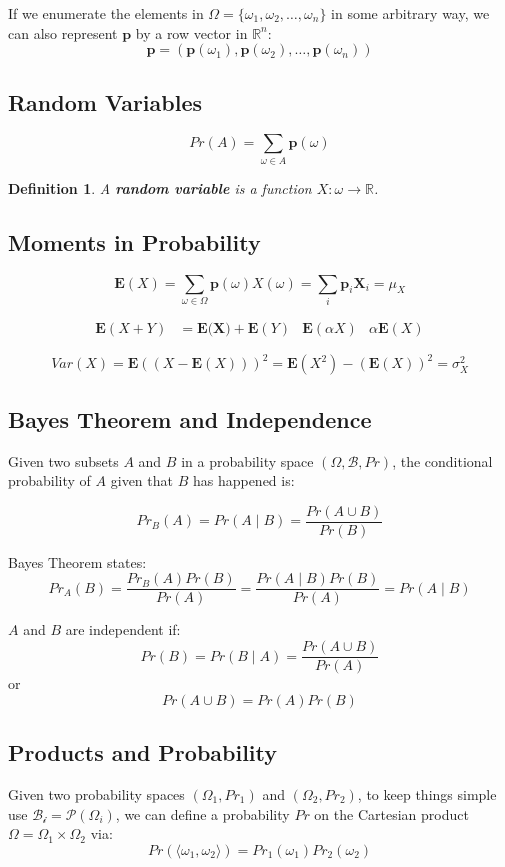 \documentclass[11pt]{article}
\newtheorem{defn}{Definition}
\begin{document}
If we enumerate the elements in $\Omega = \{\omega_1, \omega_2, \ldots, \omega_n \}$ in some arbitrary way, we can also represent $\textbf{p}$ by a row vector in $\mathbb{R}^n$:
\[
  \textbf{p} = (\textbf{p}(\omega_1), \textbf{p}(\omega_2), \ldots, \textbf{p}(\omega_n))
\]

\subsection{Random Variables} 
\[
  Pr(A) = \sum_{\omega \in A} \textbf{p}(\omega)
\]

\begin{defn}
  A \textbf{random variable} is a function $X : \omega \rightarrow \mathbb{R}$.
\end{defn}

\subsection{Moments in Probability}
\[
  \textbf{E}(X) = \sum_{\omega \in \Omega} \textbf{p}(\omega)X(\omega) = \sum_i \textbf{p}_i \textbf{X}_i = \mu_X
\]

\begin{align*}
  \textbf{E}(X + Y) &= \textbf{E(X)} + \textbf{E}(Y) & \textbf{E}(\alpha X) & \alpha \textbf{E}(X)
\end{align*}

\[
  Var(X) = \textbf{E}((X - \textbf{E}(X)))^2 = \textbf{E}(X^2) - (\textbf{E}(X))^2 = \sigma_X^2
\]

\subsection{Bayes Theorem and Independence}
Given two subsets $A$ and $B$ in a probability space $(\Omega, \mathcal{B}, Pr)$, the conditional probability of $A$ given that $B$ has happened is:

\[
  Pr_B(A) = Pr(A \mid B) = \frac{Pr(A \cup B)}{Pr(B)}
\]

Bayes Theorem states:
\[
  Pr_A(B) = \frac{Pr_B(A)Pr(B)}{Pr(A)} = \frac{Pr(A \mid B)Pr(B)}{Pr(A)} = Pr(A \mid B)
\]

$A$ and $B$ are independent if:
\[
  Pr(B) = Pr(B \mid A) = \frac{Pr(A \cup B)}{Pr(A)}
\]
or  
\[
  Pr(A \cup B) = Pr(A)Pr(B)
\]

\subsection{Products and Probability}
Given two probability spaces $(\Omega_1, Pr_1)$ and $(\Omega_2, Pr_2)$, to keep things simple use $\mathcal{B_i} = \mathcal{P}(\Omega_i)$, we can define a probability $Pr$ on the Cartesian product $\Omega = \Omega_1 \times \Omega_2$ via:
\[
  Pr(\langle \omega_1, \omega_2 \rangle) = Pr_1(\omega_1)Pr_2(\omega_2)
\]
\end{document}
